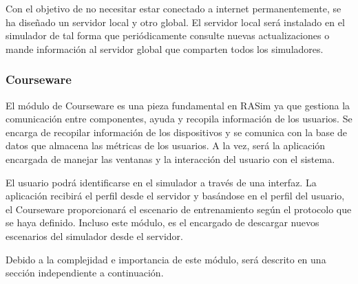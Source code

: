 Con el objetivo de no necesitar estar conectado a internet permanentemente, se ha diseñado un servidor local y otro global. El servidor local será instalado en el simulador de tal forma que periódicamente consulte nuevas actualizaciones o mande información al servidor global que comparten todos los simuladores.

\subsubsection{Courseware}


El módulo de \ac{Courseware} es una pieza fundamental en \ac{RASim} ya que gestiona la comunicación entre componentes, ayuda y recopila información de los usuarios. Se encarga de recopilar información de los dispositivos y se comunica con la base de datos que almacena las métricas de los usuarios. A la vez, será la aplicación encargada de manejar las ventanas y la interacción del usuario con el sistema. 

El usuario podrá identificarse en el simulador a través de una interfaz. La aplicación recibirá el perfil desde el servidor y basándose en el perfil del usuario, el \ac{Courseware} proporcionará el escenario de entrenamiento según el protocolo que se haya definido. Incluso este módulo, es el encargado de descargar nuevos escenarios del simulador desde el servidor. 

Debido a la complejidad e importancia de este módulo, será descrito en una sección independiente a continuación.

